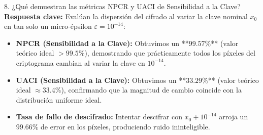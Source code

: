 \documentclass[11pt,letterpaper]{article}
\begin{document}
\begin{pregunta}{8. ¿Qué demuestran las métricas NPCR y UACI de Sensibilidad a la Clave?}
\textbf{Respuesta clave:}  
Evalúan la dispersión del cifrado al variar la clave nominal $x_0$ en tan solo un micro-épsilon $\varepsilon = 10^{-14}$:
\begin{itemize}
    \item \textbf{NPCR (Sensibilidad a la Clave):} Obtuvimos un **$99.57\%$** (valor teórico ideal $> 99.5\%$), demostrando que prácticamente todos los píxeles del criptograma cambian al variar la clave en $10^{-14}$.
    \item \textbf{UACI (Sensibilidad a la Clave):} Obtuvimos un **$33.29\%$** (valor teórico ideal $\approx 33.4\%$), confirmando que la magnitud de cambio coincide con la distribución uniforme ideal.
    \item \textbf{Tasa de fallo de descifrado:} Intentar descifrar con $x_0 + 10^{-14}$ arroja un $99.66\%$ de error en los píxeles, produciendo ruido ininteligible.
\end{itemize}
\end{pregunta}
\end{document}

